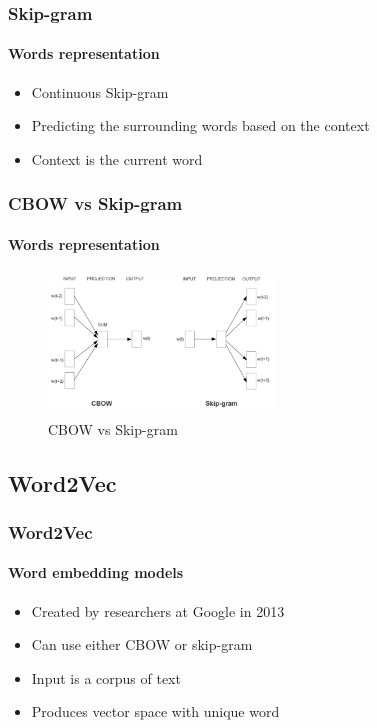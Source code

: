 \begin{frame}
\frametitle{Skip-gram}
	\framesubtitle{Words representation}

	\begin{itemize}
		\item Continuous Skip-gram
		\item Predicting the surrounding words based on the context
		\item Context is the current word
	\end{itemize}

\end{frame}


\begin{frame}
\frametitle{CBOW vs Skip-gram}
	\framesubtitle{Words representation}

	\begin{figure}
		\includegraphics[width=6cm]{./figures/cbow_skip_gram}
		\caption{CBOW vs Skip-gram}
	\end{figure}
	
\end{frame}


\subsection{Word2Vec}


\begin{frame}
\frametitle{Word2Vec}
	\framesubtitle{Word embedding models}

	\begin{itemize}
		\item Created by researchers at Google in 2013
		\item Can use either CBOW or skip-gram
		\item Input is a corpus of text
		\item Produces vector space with unique word 
	\end{itemize}

\end{frame}


